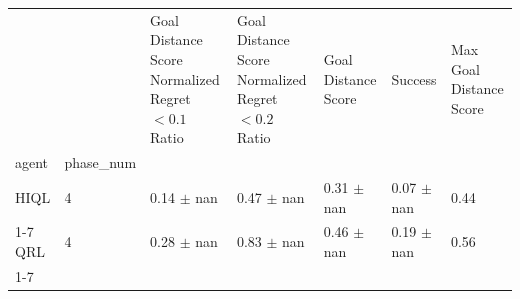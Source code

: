 \begin{tabular}{lllllll}
\toprule
 &  & Goal Distance Score Normalized Regret $< 0.1$ Ratio & Goal Distance Score Normalized Regret $< 0.2$ Ratio & Goal Distance Score & Success & Max Goal Distance Score \\
agent & phase_num &  &  &  &  &  \\
\midrule
HIQL & 4 & 0.14 $\pm$ nan & 0.47 $\pm$ nan & 0.31 $\pm$ nan & 0.07 $\pm$ nan & 0.44 \\
\cline{1-7}
QRL & 4 & 0.28 $\pm$ nan & 0.83 $\pm$ nan & 0.46 $\pm$ nan & 0.19 $\pm$ nan & 0.56 \\
\cline{1-7}
\bottomrule
\end{tabular}
